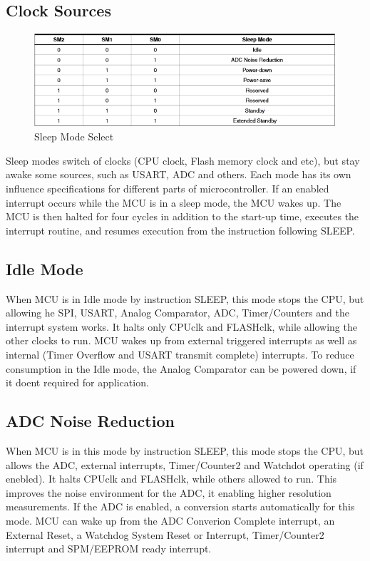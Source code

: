 \documentclass[english]{article}
\begin{document}
\subsection{Clock Sources}
\begin{figure}[H]
\caption{Sleep Mode Select}
\centerline{\includegraphics[scale=0.8]{MicroLab1/pictures/2}}
\end{figure}
Sleep modes switch of clocks (CPU clock, Flash memory clock and etc), but stay awake some sources, such as USART, ADC and others. Each mode has its own influence specifications for different parts of microcontroller. If an enabled interrupt occurs while the MCU is in a sleep mode, the MCU wakes up. The MCU is then halted for four cycles in addition to the start-up time, executes the interrupt routine, and resumes execution from the instruction following SLEEP.
\subsection{Idle Mode}
When MCU is in Idle mode by instruction SLEEP, this mode stops the CPU, but allowing he SPI, USART, Analog Comparator, ADC, Timer/Counters and the interrupt system works. It halts only CPUclk and FLASHclk, while allowing the other clocks to run. MCU wakes up from external triggered interrupts as well as internal (Timer Overflow and USART transmit complete) interrupts. To reduce consumption in the Idle mode, the Analog Comparator can be powered down, if it doent required for application.
\subsection{ADC Noise Reduction}
When MCU is in this mode by instruction SLEEP, this mode stops the CPU, but allows the ADC, external interrupts, Timer/Counter2 and Watchdot operating (if enebled). It halts CPUclk and FLASHclk, while others allowed to run. This improves the noise environment for the ADC, it enabling higher resolution measurements. If the ADC is enabled, a conversion starts automatically for this mode. MCU can wake up from the ADC Converion Complete interrupt, an External Reset, a Watchdog System Reset or Interrupt, Timer/Counter2 interrupt and SPM/EEPROM ready interrupt.
\end{document}
